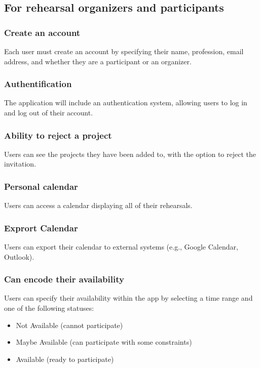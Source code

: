 \documentclass[11pt]{article}
\begin{document}
\subsection{For rehearsal organizers and participants}

\subsubsection{Create an account}
Each user must create an account by specifying their name, profession, email address, and whether they are a participant or an organizer.

\subsubsection{Authentification}
The application will include an authentication system, allowing users to log in and log out of their account.

\subsubsection{Ability to reject a project}
Users can see the projects they have been added to, with the option to reject the invitation.

\subsubsection{Personal calendar}
Users can access a calendar displaying all of their rehearsals.

\subsubsection{Exprort Calendar}
Users can export their calendar to external systems (e.g., Google Calendar, Outlook).

\subsubsection{Can encode their availability}
Users can specify their availability within the app by selecting a time range and one of the following statuses: 
\begin{itemize} 
    \item Not Available (cannot participate) 
    \item Maybe Available (can participate with some constraints) 
    \item Available (ready to participate) 
\end{itemize}
\end{document}
